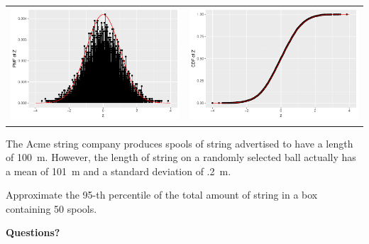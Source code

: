 \begin{frame}
\begin{center}
{      \begin{tabular}{cc}
      \includegraphics[width = .5\textwidth]{figure/clt3-13} &
      \includegraphics[width = .5\textwidth]{figure/clt3-14}
      \end{tabular}
     }
  
  \end{center}
  
\end{frame}


\begin{frame}
  \begin{block}{\example}
    The Acme string company produces spools of string advertised to have a length of 100~m. However, the length of string on a randomly selected ball actually has a mean of 101~m and a standard deviation of .2~m.

    \bigskip
    
    Approximate the 95-th percentile of the total amount of string in a box containing 50 spools.
  \end{block}
\end{frame}

\begin{frame}

  \begin{center}
    \Large{\textbf{Questions?}}
  \end{center}
\end{frame}

